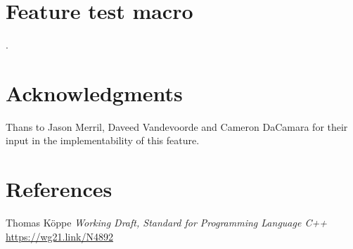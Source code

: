 \documentclass{wg21}
\begin{document}
\section{Feature test macro}

.


\section{Acknowledgments}

Thans to Jason Merril, Daveed Vandevoorde and Cameron DaCamara for their input in the implementability of this feature.

\section{References}

\renewcommand{\section}[2]{}%



\begin{thebibliography}{9}

Thomas Köppe
\emph{Working Draft, Standard for Programming Language C++}\newline
\url{https://wg21.link/N4892}


\end{thebibliography}
\end{document}
